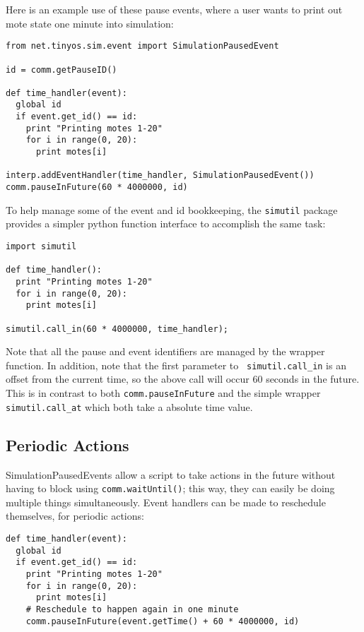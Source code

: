 \documentclass[10pt]{article}
\begin{document}
Here is an example use of these pause events, where a user wants to
print out mote state one minute into simulation:

\begin{verbatim}
from net.tinyos.sim.event import SimulationPausedEvent

id = comm.getPauseID()

def time_handler(event):
  global id
  if event.get_id() == id:
    print "Printing motes 1-20"
    for i in range(0, 20):
      print motes[i]

interp.addEventHandler(time_handler, SimulationPausedEvent())
comm.pauseInFuture(60 * 4000000, id)
\end{verbatim}

To help manage some of the event and id bookkeeping, the {\tt simutil}
package provides a simpler python function interface to accomplish the
same task:

\begin{verbatim}
import simutil

def time_handler():
  print "Printing motes 1-20"
  for i in range(0, 20):
    print motes[i]

simutil.call_in(60 * 4000000, time_handler);

\end{verbatim}

Note that all the pause and event identifiers are managed by the
wrapper function. In addition, note that the first parameter to {\tt
simutil.call\_in} is an offset from the current time, so the above
call will occur 60 seconds in the future. This is in contrast to both
{\tt comm.pauseInFuture} and the simple wrapper {\tt simutil.call\_at}
which both take a absolute time value.

\subsection{Periodic Actions}
\label{sec:periodic}

SimulationPausedEvents allow a script to take actions in the future
without having to block using {\tt comm.waitUntil()}; this way, they
can easily be doing multiple things simultaneously. Event handlers
can be made to reschedule themselves, for periodic actions:

\begin{verbatim}
def time_handler(event):
  global id
  if event.get_id() == id:
    print "Printing motes 1-20"
    for i in range(0, 20):
      print motes[i]
    # Reschedule to happen again in one minute
    comm.pauseInFuture(event.getTime() + 60 * 4000000, id)
\end{verbatim}
\end{document}
